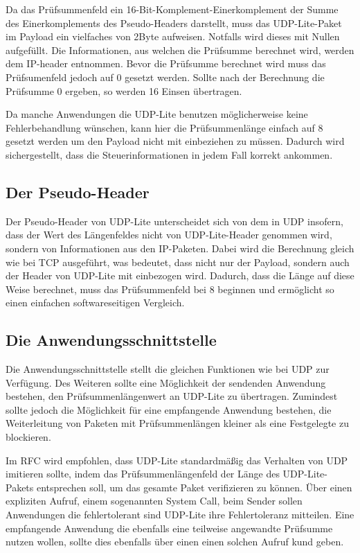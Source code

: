 \documentclass{template}
\begin{document}
Da das Prüfsummenfeld ein 16-Bit-Komplement-Einerkomplement der Summe
des Einerkomplements des Pseudo-Headers darstellt, muss das UDP-Lite-Paket
im Payload ein vielfaches von 2Byte aufweisen. Notfalls wird dieses mit
Nullen aufgefüllt. Die Informationen, aus welchen die Prüfsumme berechnet
wird, werden dem IP-header entnommen. Bevor die Prüfsumme berechnet wird
muss das Prüfsumenfeld jedoch auf 0 gesetzt werden. Sollte nach der
Berechnung die Prüfsumme 0 ergeben, so werden 16 Einsen übertragen.

Da manche Anwendungen die UDP-Lite benutzen möglicherweise keine
Fehlerbehandlung wünschen, kann hier die Prüfsummenlänge einfach
auf 8 gesetzt werden um den Payload nicht mit einbeziehen zu müssen.
Dadurch wird sichergestellt, dass die Steuerinformationen in jedem
Fall korrekt ankommen.


\subsection{Der Pseudo-Header}

Der Pseudo-Header von UDP-Lite unterscheidet sich von dem in UDP
insofern, dass der Wert des Längenfeldes nicht von UDP-Lite-Header genommen wird,
sondern von Informationen aus den IP-Paketen. Dabei wird die
Berechnung gleich wie bei TCP ausgeführt, was bedeutet, dass
nicht nur der Payload, sondern auch der Header von UDP-Lite mit
einbezogen wird. Dadurch, dass die Länge auf diese Weise berechnet,
muss das Prüfsummenfeld bei 8 beginnen und ermöglicht so einen
einfachen softwareseitigen Vergleich.


\subsection{Die Anwendungsschnittstelle}

Die Anwendungsschnittstelle stellt die gleichen Funktionen wie
bei UDP zur Verfügung. Des Weiteren sollte eine Möglichkeit der
sendenden Anwendung bestehen, den Prüfsummenlängenwert an UDP-Lite
zu übertragen. Zumindest sollte jedoch die Möglichkeit für eine
empfangende Anwendung bestehen, die Weiterleitung von Paketen mit
Prüfsummenlängen kleiner als eine Festgelegte zu blockieren.

Im RFC wird empfohlen, dass UDP-Lite standardmäßig das Verhalten
von UDP imitieren sollte, indem das Prüfsummenlängenfeld der
Länge des UDP-Lite-Pakets entsprechen soll, um das gesamte Paket
verifizieren zu können. Über einen expliziten Aufruf, einem
sogenannten System Call, beim Sender sollen Anwendungen die 
fehlertolerant sind UDP-Lite ihre Fehlertoleranz
mitteilen. Eine empfangende Anwendung die ebenfalls eine teilweise
angewandte Prüfsumme nutzen wollen, sollte dies ebenfalls über
einen einen solchen Aufruf kund geben.
\end{document}
